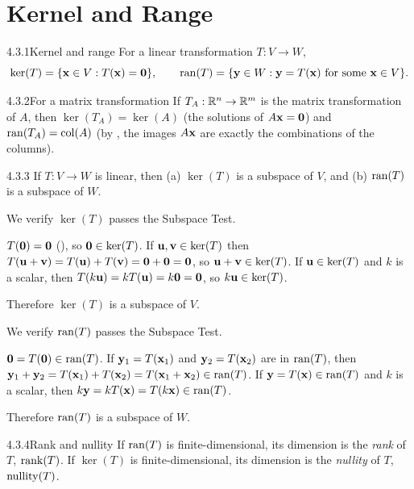\section{Kernel and Range}
\label{sec:4.3}

\begin{defns}{4.3.1}{Kernel and range}
For a linear transformation $T:V\to W$,
\[
\ker(T)=\{\mathbf{x}\in V:T(\mathbf{x})=\mathbf{0}\},\qquad \operatorname{ran}(T)=\{\mathbf{y}\in W:\mathbf{y}=T(\mathbf{x})\text{ for some }\mathbf{x}\in V\}.
\]
\end{defns}

\begin{exmp}{4.3.2}{For a matrix transformation}
If $T_A:\mathbb{R}^n\to\mathbb{R}^m$ is the matrix transformation of $A$, then $\ker(T_A)=\ker(A)$ (the solutions of $A\mathbf{x}=\mathbf{0}$) and $\operatorname{ran}(T_A)=\operatorname{col}(A)$ (by , the images $A\mathbf{x}$ are exactly the combinations of the columns).
\end{exmp}

\begin{thms}{4.3.3}{}
If $T:V\to W$ is linear, then
\textup{(a)} $\ker(T)$ is a subspace of $V$, and
\textup{(b)} $\operatorname{ran}(T)$ is a subspace of $W$.
\end{thms}

\begin{prf}
 We verify $\ker(T)$ passes the Subspace Test.
\begin{checks}
 $T(\mathbf{0})=\mathbf{0}$ (), so $\mathbf{0}\in\ker(T)$.
 If $\mathbf{u},\mathbf{v}\in\ker(T)$ then $T(\mathbf{u}+\mathbf{v})=T(\mathbf{u})+T(\mathbf{v})=\mathbf{0}+\mathbf{0}=\mathbf{0}$, so $\mathbf{u}+\mathbf{v}\in\ker(T)$.
 If $\mathbf{u}\in\ker(T)$ and $k$ is a scalar, then $T(k\mathbf{u})=kT(\mathbf{u})=k\mathbf{0}=\mathbf{0}$, so $k\mathbf{u}\in\ker(T)$.
\end{checks}
Therefore $\ker(T)$ is a subspace of $V$.

 We verify $\operatorname{ran}(T)$ passes the Subspace Test.
\begin{checks}
 $\mathbf{0}=T(\mathbf{0})\in\operatorname{ran}(T)$.
 If $\mathbf{y}_1=T(\mathbf{x}_1)$ and $\mathbf{y}_2=T(\mathbf{x}_2)$ are in $\operatorname{ran}(T)$, then $\mathbf{y}_1+\mathbf{y}_2=T(\mathbf{x}_1)+T(\mathbf{x}_2)=T(\mathbf{x}_1+\mathbf{x}_2)\in\operatorname{ran}(T)$.
 If $\mathbf{y}=T(\mathbf{x})\in\operatorname{ran}(T)$ and $k$ is a scalar, then $k\mathbf{y}=kT(\mathbf{x})=T(k\mathbf{x})\in\operatorname{ran}(T)$.
\end{checks}
Therefore $\operatorname{ran}(T)$ is a subspace of $W$.
\end{prf}

\begin{defns}{4.3.4}{Rank and nullity}
If $\operatorname{ran}(T)$ is finite-dimensional, its dimension is the \emph{rank} of $T$, $\operatorname{rank}(T)$. If $\ker(T)$ is finite-dimensional, its dimension is the \emph{nullity} of $T$, $\operatorname{nullity}(T)$.
\end{defns}

